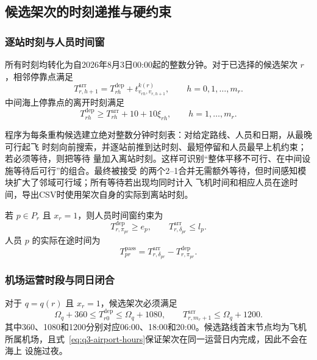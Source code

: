\documentclass[UTF8,a4paper,zihao=5]{ctexart}
\begin{document}
\subsection{候选架次的时刻递推与硬约束}

\subsubsection{逐站时刻与人员时间窗}

所有时刻均转化为自2026年8月3日00:00起的整数分钟。对于已选择的候选架次
$r$，相邻停靠点满足
\begin{equation}
  T_{r,h+1}^{\mathrm{arr}}
  =T_{rh}^{\mathrm{dep}}
  +t_{v_{rh},v_{r,h+1}}^{k(r)},
  \qquad h=0,1,\ldots,m_r.
  \label{eq:q3-time-recursion}
\end{equation}
中间海上停靠点的离开时刻满足
\begin{equation}
  T_{rh}^{\mathrm{dep}}
  \ge T_{rh}^{\mathrm{arr}}+10+10\xi_{rh},
  \qquad h=1,\ldots,m_r.
  \label{eq:q3-dwell-wait}
\end{equation}

程序为每条重构候选建立绝对整数分钟时刻表：对给定路线、人员和日期，从最晚可行起飞
时刻向前搜索，并逐站前推到达时刻、最短停留和人员最早上机约束；若必须等待，则把等待
量加入离站时刻。这样可识别“整体平移不可行、在中间设施等待后可行”的组合。最终被接受
的两个2--1合并无需额外等待，但时间感知模块扩大了邻域可行域；所有等待若出现均同时计入
飞机时间和相应人员在途时间，导出CSV时使用架次自身的实际到离站时刻。

若 $p\in P_r$ 且 $x_r=1$，则人员时间窗约束为
\begin{equation}
  T_{r,\pi_{pr}}^{\mathrm{dep}}\ge e_p,
  \qquad
  T_{r,\delta_{pr}}^{\mathrm{arr}}\le l_p.
  \label{eq:q3-passenger-window}
\end{equation}
人员 $p$ 的实际在途时间为
\begin{equation}
  T_{pr}^{\mathrm{pass}}
  =T_{r,\delta_{pr}}^{\mathrm{arr}}
  -T_{r,\pi_{pr}}^{\mathrm{dep}}.
  \label{eq:q3-passenger-time}
\end{equation}

\subsubsection{机场运营时段与同日闭合}

对于 $q=q(r)$ 且 $x_r=1$，候选架次必须满足
\begin{equation}
  \Omega_q+360
  \le T_{r0}^{\mathrm{dep}}
  \le \Omega_q+1080,
  \qquad
  T_{r,m_r+1}^{\mathrm{arr}}\le\Omega_q+1200.
  \label{eq:q3-airport-hours}
\end{equation}
其中360、1080和1200分别对应06:00、18:00和20:00。候选路线首末节点均为飞机
所属机场，且式~\eqref{eq:q3-airport-hours}保证架次在同一运营日内完成，因此不会在海上
设施过夜。
\end{document}
